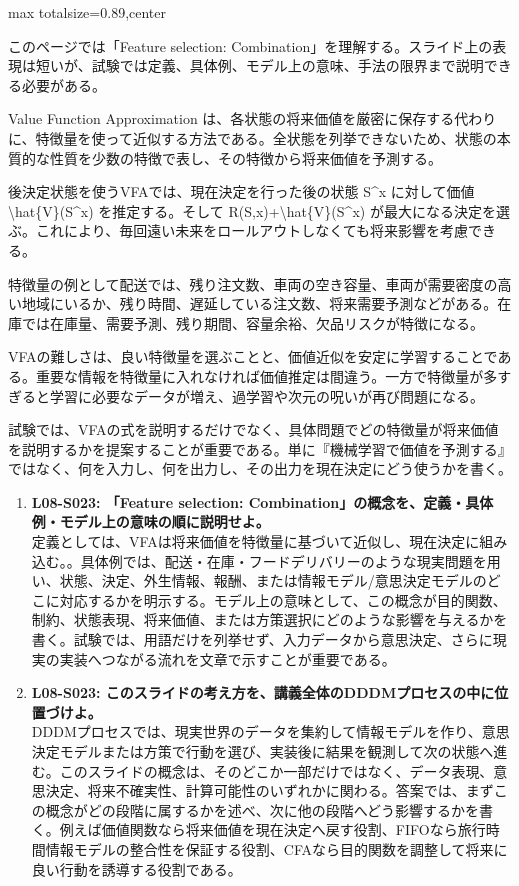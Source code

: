 \begin{minipage}[t]{0.58\textwidth}
\begin{adjustbox}{max totalsize={\textwidth}{0.89\textheight},center}
\begin{minipage}{\textwidth}\scriptsize
{}このページでは「Feature selection: Combination」を理解する。スライド上の表現は短いが、試験では定義、具体例、モデル上の意味、手法の限界まで説明できる必要がある。\par
Value Function Approximation は、各状態の将来価値を厳密に保存する代わりに、特徴量を使って近似する方法である。全状態を列挙できないため、状態の本質的な性質を少数の特徴で表し、その特徴から将来価値を予測する。\par
後決定状態を使うVFAでは、現在決定を行った後の状態 S\textasciicircum{}x に対して価値 \textbackslash{}hat\{V\}(S\textasciicircum{}x) を推定する。そして R(S,x)+\textbackslash{}hat\{V\}(S\textasciicircum{}x) が最大になる決定を選ぶ。これにより、毎回遠い未来をロールアウトしなくても将来影響を考慮できる。\par
特徴量の例として配送では、残り注文数、車両の空き容量、車両が需要密度の高い地域にいるか、残り時間、遅延している注文数、将来需要予測などがある。在庫では在庫量、需要予測、残り期間、容量余裕、欠品リスクが特徴になる。\par
VFAの難しさは、良い特徴量を選ぶことと、価値近似を安定に学習することである。重要な情報を特徴量に入れなければ価値推定は間違う。一方で特徴量が多すぎると学習に必要なデータが増え、過学習や次元の呪いが再び問題になる。\par
試験では、VFAの式を説明するだけでなく、具体問題でどの特徴量が将来価値を説明するかを提案することが重要である。単に『機械学習で価値を予測する』ではなく、何を入力し、何を出力し、その出力を現在決定にどう使うかを書く。\par{}\begin{enumerate}\item \textbf{L08-S023: 「Feature selection: Combination」の概念を、定義・具体例・モデル上の意味の順に説明せよ。}\\定義としては、VFAは将来価値を特徴量に基づいて近似し、現在決定に組み込む。。具体例では、配送・在庫・フードデリバリーのような現実問題を用い、状態、決定、外生情報、報酬、または情報モデル/意思決定モデルのどこに対応するかを明示する。モデル上の意味として、この概念が目的関数、制約、状態表現、将来価値、または方策選択にどのような影響を与えるかを書く。試験では、用語だけを列挙せず、入力データから意思決定、さらに現実の実装へつながる流れを文章で示すことが重要である。\item \textbf{L08-S023: このスライドの考え方を、講義全体のDDDMプロセスの中に位置づけよ。}\\DDDMプロセスでは、現実世界のデータを集約して情報モデルを作り、意思決定モデルまたは方策で行動を選び、実装後に結果を観測して次の状態へ進む。このスライドの概念は、そのどこか一部だけではなく、データ表現、意思決定、将来不確実性、計算可能性のいずれかに関わる。答案では、まずこの概念がどの段階に属するかを述べ、次に他の段階へどう影響するかを書く。例えば価値関数なら将来価値を現在決定へ戻す役割、FIFOなら旅行時間情報モデルの整合性を保証する役割、CFAなら目的関数を調整して将来に良い行動を誘導する役割である。\end{enumerate}

\end{minipage}
\end{adjustbox}
\end{minipage}
